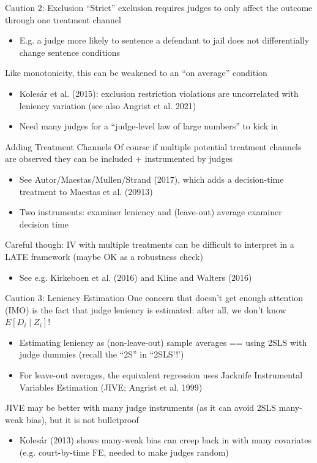 \documentclass{beamer}
\begin{document}
\begin{frame}{Caution 2: Exclusion}
``Strict'' exclusion requires judges to only affect the outcome through one treatment channel\smallskip
\begin{itemize}
\item E.g. a judge more likely to sentence a defendant to jail does not differentially change sentence conditions
\end{itemize}\medskip\pause{}
Like monotonicity, this can be weakened to an ``on average'' condition\medskip
\begin{itemize}
\item Koles\'{a}r et al. (2015): exclusion restriction violations are uncorrelated with leniency variation (see also Angrist et al. 2021)\smallskip
\item Need many judges for a ``judge-level law of large numbers'' to kick in
\end{itemize}
\end{frame}

\begin{frame}{Adding Treatment Channels}
Of course if multiple potential treatment channels are observed they can be included + instrumented by judges\smallskip
\begin{itemize}
\item See Autor/Maestas/Mullen/Strand (2017), which adds a decision-time treatment to Maestas et al. (20913)\smallskip
\item Two instruments: examiner leniency and (leave-out) average examiner decision time
\end{itemize}\medskip\pause{}
Careful though: IV with multiple treatments can be difficult to interpret in a LATE framework (maybe OK as a robustness check)\smallskip
\begin{itemize}
\item See e.g. Kirkeboen et al. (2016) and Kline and Walters (2016)
\end{itemize}

\end{frame}

\begin{frame}{Caution 3: Leniency Estimation}
One concern that doesn't get enough attention (IMO) is the fact that judge leniency is estimated: after all, we don't know $E[D_i\mid Z_i]$!\smallskip\pause{}
\begin{itemize}
\item Estimating leniency as (non-leave-out) sample averages == using 2SLS with judge dummies (recall the ``2S'' in ``2SLS'!')\smallskip\pause{}
\item For leave-out averages, the equivalent regression uses Jacknife Instrumental Variables Estimation (JIVE; Angrist et al. 1999)
\end{itemize}\medskip\pause{}
JIVE may be better with many judge instruments (as it can avoid 2SLS many-weak bias), but it is not bulletproof\smallskip
\begin{itemize}
\item Koles\'{a}r (2013) shows many-weak bias can creep back in with many covariates (e.g. court-by-time FE, needed to make judges random)
\end{itemize}
\end{frame}
\end{document}
